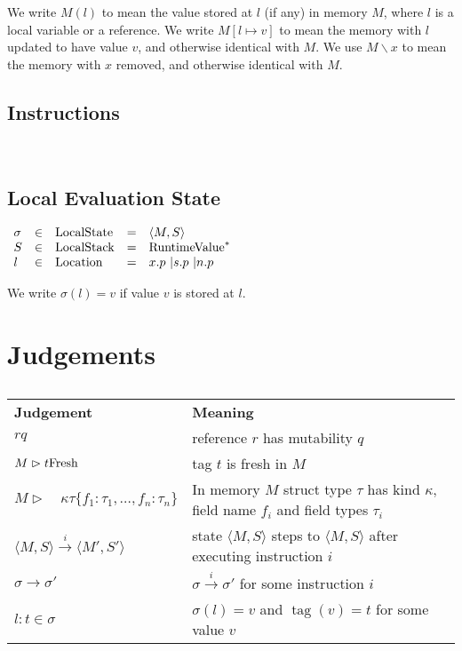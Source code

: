 \documentclass{article}
\newcommand{\tmop}[1]{\ensuremath{\operatorname{#1}}}
\newcommand{\tmstrong}[1]{\textbf{#1}}
\newcommand{\tmxspace}{\hspace{1em}}
\begin{document}
We write $M (l)$ to mean the value stored at $l$ (if any) in memory $M$, where
$l$ is a local variable or a reference. We write $M [l \mapsto v]$ to mean the
memory with $l$ updated to have value $v$, and otherwise identical with $M$.
We use $M\backslash x$ to mean the memory with $x$ removed, and otherwise
identical with $M$.

\subsection{Instructions}

\

\subsection{Local Evaluation State}

$\begin{array}{lllll}
  \sigma & \in & \tmop{LocalState} & = & \langle M, S \rangle\\
  S & \in & \tmop{LocalStack} & = & \tmop{RuntimeValue}^{\ast}\\
  l & \in & \tmop{Location} & = & \text{$x.p$ \textbar $s.p$ \textbar $n.p$ }
\end{array}$

We write $\sigma (l) = v$ if value $v$ is stored at $l$.

\section{Judgements}

\begin{table}[h]
  \begin{tabular}{ll}
    {\tmstrong{Judgement}} & {\tmstrong{Meaning}}\\
    $r q$ & reference $r$ has mutability $q$\\
    $M \vartriangleright t \tmstrong{\tmop{Fresh}}$ & tag $t$ is fresh in
    $M$\\
    $M \vartriangleright \tmxspace \kappa \tau \{ f_1 : \tau_1, \ldots, f_n :
    \tau_n \}$ & In memory $M$ struct type $\tau$ has kind $\kappa$, field
    name $f_i$ and field types $\tau_i$\\
    $\langle M, S \rangle \xrightarrow{i} \langle M', S' \rangle$ & state
    $\langle M, S \rangle$ steps to $\langle M, S \rangle$ after executing
    instruction $i$\\
    $\sigma \rightarrow \sigma'$ & $\sigma \xrightarrow{i} \sigma'$ for some
    instruction $i$\\
    $l : t \in \sigma$ & $\sigma (l) = v$ and $\tmop{tag} (v) = t$ for some
    value $v$
  \end{tabular}
  \caption{}
\end{table}
\end{document}
